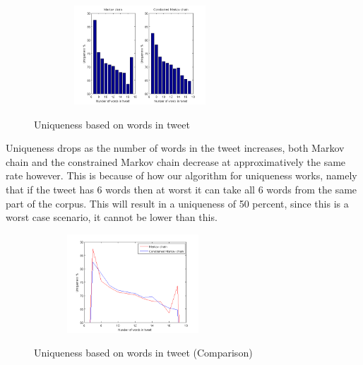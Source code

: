 \documentclass[a4paper,12pt]{article}
\begin{document}
\begin{figure}[h!]
  \hfill
  \begin{center}
  	{\includegraphics[width=300, height = 140]{UniqByNumWordsTweet.png}}
  \end{center}
  \caption{Uniqueness based on words in tweet}
 \end{figure}
 
 Uniqueness drops as the number of words in the tweet increases, both Markov chain and the constrained Markov chain decrease at  approximatively the same rate however. This is because of how our algorithm for uniqueness works, namely that if the tweet has 6 words then at worst it can take all 6 words from the same part of the corpus. This will result in a uniqueness of 50 percent, since this is a worst case scenario, it cannot be lower than this.
 
 \begin{figure}[h!]
   \hfill
   \begin{center}
  	{\includegraphics[width=280, height = 140]{UniqByNumWordsTweet2.png}}
  \end{center}
  \hfill
  \caption{Uniqueness based on words in tweet (Comparison)}
 \end{figure}
 
\end{document}
